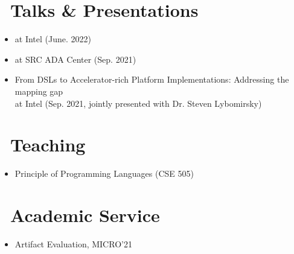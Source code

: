 \documentclass{resume}
\begin{document}
\section{\faSlideshare\ Talks \& Presentations}
\begin{itemize}
    \item {} at Intel (June. 2022)
    \item {} at SRC ADA Center (Sep. 2021)
    \item From DSLs to Accelerator-rich Platform Implementations: Addressing the mapping gap \\at Intel (Sep. 2021, jointly presented with Dr. Steven Lybomirsky)
\end{itemize}

\section{\faMortarBoard\ Teaching}
\begin{itemize}
    \item Principle of Programming Languages (CSE 505)
\end{itemize}

\section{\faUsers\ Academic Service}
\begin{itemize}
    \item Artifact Evaluation, MICRO'21
\end{itemize}
\end{document}
